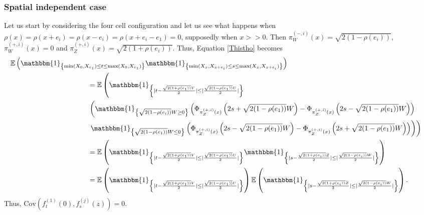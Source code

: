 \documentclass[12pt]{article}
\theoremstyle{Theorem}
\begin{document}
\subsubsection{Spatial independent case} 
Let us start by considering the four cell configuration and let us see what happens when ${\rho(x) = \rho(x+e_i) = \rho(x-e_i) = \rho(x + e_i - e_1) = 0}$, supposedly when $x > > 0$. Then
$\pi^{\scriptscriptstyle(-, i)}_{W}(x) = \sqrt{2(1-\rho(e_i))}$, $\pi^{\scriptscriptstyle(+, i)}_{W}(x) = 0$ and $\pi^{\scriptscriptstyle(+, i)}_{Z}(x) = \sqrt{2(1+\rho(e_i))}.$ Thus, Equation \eqref{Thistho} becomes 
{\small
\begin{align*}
\mathbb{E}\left(\mathbbm{1}_{\left\{\min(X_{\scriptscriptstyle 0}, X_{e_1}) \leq t \leq \max(X_{\scriptscriptstyle 0}, X_{e_1})\right\}}\mathbbm{1}_{\left\{\min(X_{\scriptscriptstyle x}, X_{x+e_i}) \leq s \leq \max(X_{\scriptscriptstyle x}, X_{x+e_i}) \right\}}\right) \nonumber \\
& \hspace{-10cm} = \mathbb{E}\left(\mathbbm{1}_{\left\{ |t - \frac{\sqrt{2(1+\rho(e_1))}V}{2}| \leq |\frac{\sqrt{2(1-\rho(e_1))}U}{2}|\right\}} \right.  \\
& \left. \hspace{-10cm} \left(\mathbbm{1}_{\left\{\sqrt{2(1-\rho(e_i))}W \geq 0\right\}} \left(\Phi_{\pi^{\scriptscriptstyle(+, i)}_{Z}(x)}\left( 2s + \sqrt{2(1-\rho(e_1))} W\right) - \Phi_{\pi^{\scriptscriptstyle(+, i)}_{Z}(x)}\left(2s - \sqrt{2(1-\rho(e_1))} W\right)\right) \right. \right. \\
&  \hspace{-10cm} \left. \left. \mathbbm{1}_{\left\{\sqrt{2(1-\rho(e_1))} W  \leq 0\right\}} \left(\Phi_{\pi^{\scriptscriptstyle(+, i)}_{Z}(x)}\left( 2s - \sqrt{2(1-\rho(e_1))}W \right) - \Phi_{\pi^{\scriptscriptstyle(+, i)}_{Z}(x)}\left(2s + \sqrt{2(1-\rho(e_1))} W\right)\right)\right)\right)\\ 
& \hspace{-10cm} = \mathbb{E}\left(\mathbbm{1}_{\left\{ |t - \frac{\sqrt{2(1+\rho(e_1))}V}{2}| \leq |\frac{\sqrt{2(1-\rho(e_1))}U}{2}|\right\}}\mathbbm{1}_{\left\{ |s - \frac{\sqrt{2(1+\rho(e_i))}Z}{2}| \leq |\frac{\sqrt{2(1-\rho(e_i))}W}{2}|\right\}}\right) \\
& \hspace{-10cm} = \mathbb{E}\left(\mathbbm{1}_{\left\{ |t - \frac{\sqrt{2(1+\rho(e_1))}V}{2}| \leq |\frac{\sqrt{2(1-\rho(e_1))}U}{2}|\right\}}\right)\mathbb{E}\left(\mathbbm{1}_{\left\{ |s - \frac{\sqrt{2(1+\rho(e_i))}Z}{2}| \leq |\frac{\sqrt{2(1-\rho(e_i))}W}{2}|\right\}}\right).
\end{align*}
}Thus, $\text{Cov}\left(f_{t}^{\scriptscriptstyle (1)}(0), f_{s}^{ \scriptscriptstyle (j)}(z)\right) = 0.$
\end{document}
